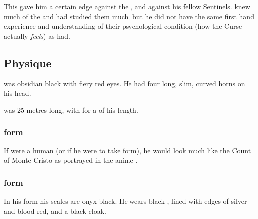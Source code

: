 This gave him a certain edge against the \satharioth, and against his fellow Sentinels. 
\Secherdamon{} knew much of the \resphain{} and had studied them much, but he did not have the same first hand experience and understanding of their psychological condition (how the Curse actually \emph{feels}) as \Ishnaruchaefir{} had. 









\subsection{Physique}
\Ishnaruchaefir{} was obsidian black with fiery red eyes. 
He had four long, slim, curved horns on his head. 

\Ishnaruchaefir was 25 metres long, with  for a \dragon of his length. 





\subsubsection{\Human{} form}
If \Ishnaruchaefir{} were a human (or if he were to take \human{} form), he would look much like the Count of Monte Cristo as portrayed in the anime \cite{Anime:Gankutsuou}. 





\subsubsection{\Scathaese{} form}
In his \scathaese{} form his scales are onyx black. 
He wears black \armour, lined with edges of silver and blood red, and a black cloak. 

